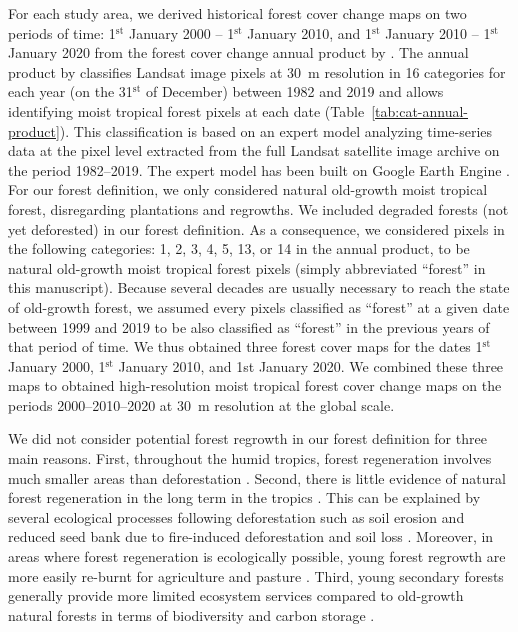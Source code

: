 \documentclass[12pt,]{article}
\begin{document}
For each study area, we derived historical forest cover change maps on two periods of time: 1\(^{\text{st}}\) January 2000 -- 1\(^{\text{st}}\) January 2010, and 1\(^{\text{st}}\) January 2010 -- 1\(^{\text{st}}\) January 2020 from the forest cover change annual product by \citet{Vancutsem2020}. The annual product by \citet{Vancutsem2020} classifies Landsat image pixels at 30~m resolution in 16 categories for each year (on the 31\(^{\text{st}}\) of December) between 1982 and 2019 and allows identifying moist tropical forest pixels at each date (Table~\ref{tab:cat-annual-product}). This classification is based on an expert model analyzing time-series data at the pixel level extracted from the full Landsat satellite image archive on the period 1982--2019. The expert model has been built on Google Earth Engine \citep{Gorelick2017}. For our forest definition, we only considered natural old-growth moist tropical forest, disregarding plantations and regrowths. We included degraded forests (not yet deforested) in our forest definition. As a consequence, we considered pixels in the following categories: 1, 2, 3, 4, 5, 13, or 14 in the annual product, to be natural old-growth moist tropical forest pixels (simply abbreviated ``forest'' in this manuscript). Because several decades are usually necessary to reach the state of old-growth forest, we assumed every pixels classified as ``forest'' at a given date between 1999 and 2019 to be also classified as ``forest'' in the previous years of that period of time. We thus obtained three forest cover maps for the dates 1\(^{\text{st}}\) January 2000, 1\(^{\text{st}}\) January 2010, and 1st January 2020. We combined these three maps to obtained high-resolution moist tropical forest cover change maps on the periods 2000--2010--2020 at 30~m resolution at the global scale.

We did not consider potential forest regrowth in our forest definition for three main reasons. First, throughout the humid tropics, forest regeneration involves much smaller areas than deforestation \citep[see also 2000-2012 tree cover gain in \citet{Hansen2013}]{Vancutsem2020}. Second, there is little evidence of natural forest regeneration in the long term in the tropics \citep{Grouzis2001}. This can be explained by several ecological processes following deforestation such as soil erosion \citep{Grinand2017} and reduced seed bank due to fire-induced deforestation and soil loss \citep{Grouzis2001}. Moreover, in areas where forest regeneration is ecologically possible, young forest regrowth are more easily re-burnt for agriculture and pasture \citep{Vieilledent2020}. Third, young secondary forests generally provide more limited ecosystem services compared to old-growth natural forests in terms of biodiversity \citep{Gibson2011} and carbon storage \citep{Blanc2009}.
\end{document}
